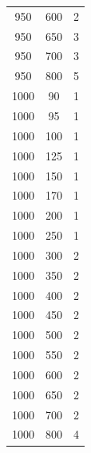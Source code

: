 \begin{longtable}{c c c}
950 & 600 & 2 \\
950 & 650 & 3 \\
950 & 700 & 3 \\
950 & 800 & 5 \\
1000 & 90 & 1 \\
1000 & 95 & 1 \\
1000 & 100 & 1 \\
1000 & 125 & 1 \\
1000 & 150 & 1 \\
1000 & 170 & 1 \\
1000 & 200 & 1 \\
1000 & 250 & 1 \\
1000 & 300 & 2 \\
1000 & 350 & 2 \\
1000 & 400 & 2 \\
1000 & 450 & 2 \\
1000 & 500 & 2 \\
1000 & 550 & 2 \\
1000 & 600 & 2 \\
1000 & 650 & 2 \\
1000 & 700 & 2 \\
1000 & 800 & 4 \\
\end{longtable}

